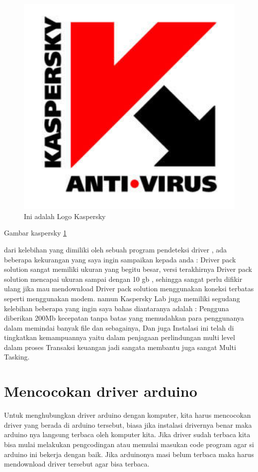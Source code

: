   \begin{figure}[ht]
  \centerline{\includegraphics[width=1\textwidth]{../figures/Kaspersky.jpg}}
  \caption{Ini adalah Logo Kaspersky}
  \label{kaspersky}
  \end{figure}

Gambar kaspersky \ref{kaspersky}



dari kelebihan yang dimiliki oleh sebuah program pendeteksi driver , ada beberapa kekurangan yang saya ingin sampaikan kepada anda  :
Driver pack solution sangat memiliki ukuran yang begitu besar,  versi terakhirnya Driver pack solution mencapai ukuran sampai dengan 10 gb , sehingga sangat perlu difikir ulang jika mau  mendownload Driver pack solution menggunakan koneksi terbatas seperti menggunakan modem.
namun Kaspersky Lab juga memiliki segudang kelebihan beberapa yang ingin saya bahas diantaranya adalah :
Pengguna diberikan 200Mb kecepatan tanpa batas yang memudahkan para penggunanya dalam memindai banyak file dan sebagainya, Dan juga Instalasi ini telah di tingkatkan kemampuannya yaitu dalam penjagaan perlindungan multi level dalam proses Transaksi keuangan jadi sangata membantu juga sangat Multi Tasking.

\section{Mencocokan driver arduino}
Untuk menghubungkan driver arduino dengan komputer, kita harus mencocokan driver yang berada di arduino tersebut, biasa jika instalasi drivernya benar maka arduino nya langsung terbaca oleh komputer kita. Jika driver sudah terbaca kita bisa mulai melakukan pengcodingan atau memulai masukan code program agar si arduino ini bekerja dengan baik. Jika arduinonya masi belum terbaca maka harus mendownload driver tersebut agar bisa terbaca.

